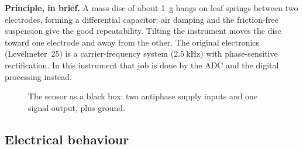 \documentclass[11pt,a4paper]{article}
\begin{document}
\textbf{Principle, in brief.}  A mass disc of about \SI{1}{\gram} hangs on leaf
springs between two electrodes, forming a differential capacitor; air
damping and the friction-free suspension give the good repeatability.
Tilting the instrument moves the disc toward one electrode and away from the
other.  The original electronics (Levelmeter~25) is a carrier-frequency
system ($\SI{2.5}{\kilo\hertz}$) with phase-sensitive rectification.  In this
instrument that job is done by the ADC and the digital processing instead.

\begin{figure}[ht]
\centering
{}
\caption{The sensor as a black box: two antiphase supply inputs and one
         signal output, plus ground.}
\label{fig:sensor}
\end{figure}

\subsection{Electrical behaviour}
\end{document}
